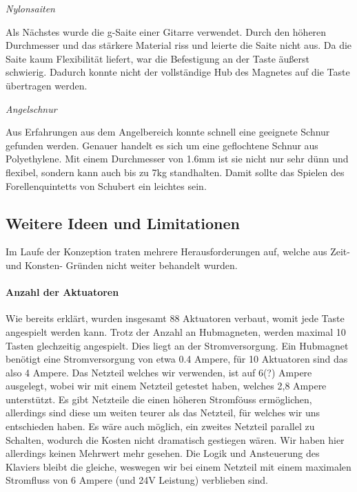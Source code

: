 \textit{Nylonsaiten}

Als Nächstes wurde die g-Saite einer Gitarre verwendet.
Durch den höheren Durchmesser und das stärkere Material riss und leierte die Saite nicht aus.
Da die Saite kaum Flexibilität liefert, war die Befestigung an der Taste äußerst schwierig.
Dadurch konnte nicht der vollständige Hub des Magnetes auf die Taste übertragen werden.

\textit{Angelschnur}

Aus Erfahrungen aus dem Angelbereich konnte schnell eine geeignete Schnur gefunden werden.
Genauer handelt es sich um eine geflochtene Schnur aus Polyethylene.
Mit einem Durchmesser von 1.6mm ist sie nicht nur sehr dünn und flexibel, sondern kann auch bis zu 7kg standhalten.
Damit sollte das Spielen des Forellenquintetts von Schubert ein leichtes sein.



\subsection{Weitere Ideen und Limitationen}

Im Laufe der Konzeption traten mehrere Herausforderungen auf, welche aus Zeit- und Konsten- Gründen nicht weiter
behandelt wurden.
\paragraph{Anzahl der Aktuatoren}
Wie bereits erklärt, wurden insgesamt 88 Aktuatoren verbaut, womit jede Taste angespielt werden kann. Trotz der Anzahl an
Hubmagneten, werden maximal 10 Tasten glechzeitig angespielt. Dies liegt an der Stromversorgung. Ein Hubmagnet benötigt
eine Stromversorgung von etwa 0.4 Ampere, für 10 Aktuatoren sind das also 4 Ampere. Das Netzteil welches wir verwenden, ist auf
6(?) Ampere ausgelegt, wobei wir mit einem Netzteil getestet haben, welches 2,8 Ampere unterstützt. Es gibt Netzteile die
einen höheren Stromföuss ermöglichen, allerdings sind diese um weiten teurer als das Netzteil, für welches wir uns entschieden haben.
Es wäre auch möglich, ein zweites Netzteil parallel zu Schalten, wodurch die Kosten nicht dramatisch gestiegen wären.
Wir haben hier allerdings keinen Mehrwert mehr gesehen. Die Logik und Ansteuerung des Klaviers bleibt die gleiche, weswegen
wir bei einem Netzteil mit einem maximalen Stromfluss von 6 Ampere (und 24V Leistung) verblieben sind.


